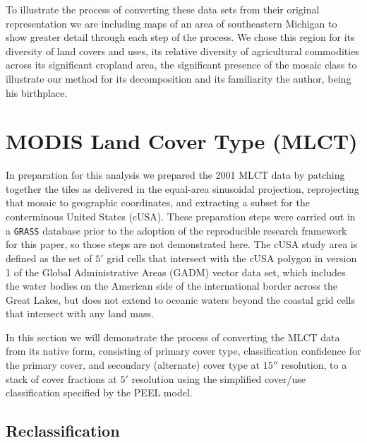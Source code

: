 To illustrate the process of converting these data sets from their
original representation we are including maps of an area of
southeastern Michigan to show greater detail through each step of the
process.  We chose this region for its diversity of land covers and
uses, its relative diversity of agricultural commodities across its
significant cropland area, the significant presence of the mosaic
class to illustrate our method for its decomposition and its
familiarity the author, being his birthplace.


\section{MODIS Land Cover Type (MLCT)}
\label{sec:mlct}

In preparation for this analysis we prepared the 2001 MLCT data by
patching together the tiles as delivered in the equal-area sinusoidal
projection, reprojecting that mosaic to geographic coordinates, and
extracting a subset for the conterminous United States (cUSA).  These
preparation steps were carried out in a \texttt{GRASS} database prior
to the adoption of the reproducible research framework for this paper,
so those steps are not demonstrated here.  The cUSA study area is
defined as the set of $5'$ grid cells that intersect with the cUSA
polygon in version 1 of the Global Administrative Areas (GADM) vector
data set, which includes the water bodies on the American side of the
international border across the Great Lakes, but does not extend to
oceanic waters beyond the coastal grid cells that intersect with any
land mass.

In this section we will demonstrate the process of converting the MLCT
data from its native form, consisting of primary cover type,
classification confidence for the primary cover, and secondary
(alternate) cover type at $15''$ resolution, to a stack of cover
fractions at $5'$ resolution using the simplified cover/use
classification specified by the PEEL model.

\subsection{Reclassification}
\label{sec:mlct-reclass}

